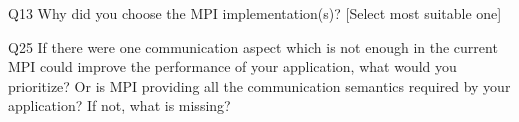 \begin{description}%
\item{Q13} Why did you choose the MPI implementation(s)? [Select most suitable one]%
\item{Q25} If there were one communication aspect which is not enough in the current MPI could improve the performance of your application, what would you prioritize? Or is MPI providing all the communication semantics required by your application? If not, what is missing?%
\end{description}%
